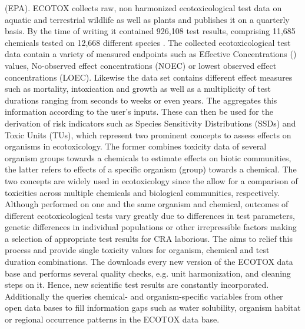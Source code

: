 (EPA). ECOTOX collects raw, non harmonized ecotoxicological test data on aquatic and terrestrial wildlife as well as plants and publishes it on a quarterly basis. By the time of writing it contained 926,108 test results, comprising 11,685 chemicals tested on 12,668 different species \citep{elonen_ecotoxicology_2018}. The collected ecotoxicological test data contain a variety of measured endpoints such as Effective Concentrations (\ecfifty{}) values, No-observed effect concentrations (NOEC) or lowest observed effect concentrations (LOEC). Likewise the data set contains different effect measures such as mortality, intoxication and growth as well as a multiplicity of test durations ranging from seconds to weeks or even years. The \etoxbase{} aggregates this information according to the user's inputs. These can then be used for the derivation of risk indicators such as Species Sensitivity Distributions (SSDs) \citep{posthuma_species_2002} and Toxic Units (TUs), which represent two prominent concepts to assess effects on organisms in ecotoxicology. The former combines toxicity data of several organism groups towards a chemicals to estimate effects on biotic communities, the latter refers to effects of a specific organism (group) towards a chemical. The two concepts are widely used in ecotoxicology \citep{kefford_definition_2011, schafer_effects_2011} since the allow for a comparison of toxicities across multiple chemicals and biological communities, respectively. Although performed on one and the same organism and chemical, outcomes of different ecotoxicological tests vary greatly due to differences in test parameters, genetic differences in individual populations or other irrepressible factors making a selection of appropriate test results for CRA laborious. The \etoxbase{} aims to relief this process and provide single toxicity values for organism, chemical and test duration combinations. The \etoxbase{} downloads every new version of the ECOTOX data base and performs several quality checks, e.g. unit harmonization, and cleaning steps on it. Hence, new scientific test results are constantly incorporated. Additionally the \etoxbase{} queries chemical- and organism-specific variables from other open data bases to fill information gaps such as water solubility, organism habitat or regional occurrence patterns in the ECOTOX data base.

\fi

